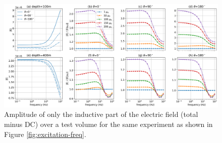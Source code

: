 \begin{figure}
    \begin{center}
    \includegraphics[width=\textwidth]{figures/excitation-freq-subtract-dc.png}
    \end{center}
\caption{
    Amplitude of only the inductive part of the electric field (total minus DC) over a test volume for the same experiment as shown in Figure \ref{fig:excitation-freq}.
}
\label{fig:excitation-freq-subtract-dc}
\end{figure}



